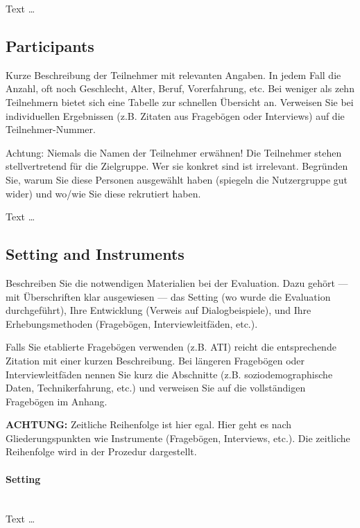 \documentclass[11pt,a4paper,english]{scrreprt}
\newenvironment{comment}
  {\par\medskip
   \begingroup\color{olive}%
   }
 {\endgroup
  \medskip}
\begin{document}
Text \dots

\subsection{Participants}
\begin{comment}
Kurze Beschreibung der Teilnehmer mit relevanten Angaben. In jedem Fall die Anzahl, oft noch Geschlecht, Alter, Beruf, Vorerfahrung, etc. Bei weniger als zehn Teilnehmern bietet sich eine Tabelle zur schnellen Übersicht an. Verweisen Sie bei individuellen Ergebnissen (z.B. Zitaten aus Fragebögen oder Interviews) auf die Teilnehmer-Nummer.

Achtung: Niemals die Namen der Teilnehmer erwähnen! Die Teilnehmer stehen stellvertretend für die Zielgruppe. Wer sie konkret sind ist irrelevant. Begründen Sie, warum Sie diese Personen ausgewählt haben (spiegeln die Nutzergruppe gut wider) und wo/wie Sie diese rekrutiert haben.
\end{comment}

Text \dots

\subsection{Setting and Instruments}
\begin{comment}
Beschreiben Sie die notwendigen Materialien bei der Evaluation. Dazu gehört — mit Überschriften klar ausgewiesen — das Setting (wo wurde die Evaluation durchgeführt), Ihre Entwicklung (Verweis auf Dialogbeispiele), und Ihre Erhebungsmethoden (Fragebögen, Interviewleitfäden, etc.).

Falls Sie etablierte Fragebögen verwenden (z.B. ATI) reicht die entsprechende Zitation mit einer kurzen Beschreibung. Bei längeren Fragebögen oder Interviewleitfäden nennen Sie kurz die Abschnitte (z.B. soziodemographische Daten, Technikerfahrung, etc.) und verweisen Sie auf die vollständigen Fragebögen im Anhang.

\textbf{ACHTUNG:} Zeitliche Reihenfolge ist hier egal. Hier geht es nach Gliederungspunkten wie Instrumente (Fragebögen, Interviews, etc.). Die zeitliche Reihenfolge wird in der Prozedur dargestellt.
\end{comment}

\paragraph{Setting}\mbox{} \\
Text \dots
\end{document}
